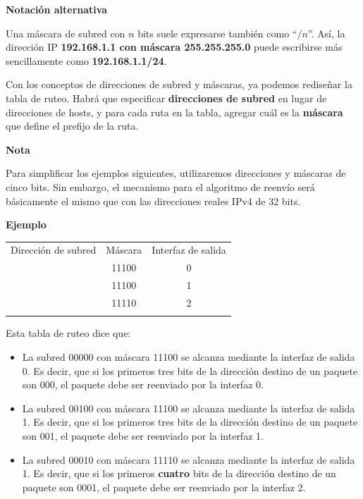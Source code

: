 \documentclass[spanish,A4,]{article}
\begin{document}
\textbf{Notación alternativa}

Una máscara de subred con $n$ bits suele expresarse también como
``$/n$''. Así, la dirección IP \textbf{192.168.1.1 con máscara
255.255.255.0} puede escribirse más sencillamente como
\textbf{192.168.1.1/24}.

Con los conceptos de direcciones de subred y máscaras, ya podemos
rediseñar la tabla de ruteo. Habrá que especificar \textbf{direcciones
de subred} en lugar de direcciones de hosts, y para cada ruta en la
tabla, agregar cuál es la \textbf{máscara} que define el prefijo de la
ruta.

\textbf{Nota}

Para simplificar los ejemplos siguientes, utilizaremos direcciones y
máscaras de cinco bits. Sin embargo, el mecanismo para el algoritmo de
reenvío será básicamente el mismo que con las direcciones reales IPv4 de
32 bits.

\textbf{Ejemplo}

\begin{longtable}[c]{@{}ccc@{}}
\toprule\addlinespace
Dirección de subred & Máscara & Interfaz de salida
\\\addlinespace
\midrule\endhead
00000 & 11100 & 0
\\\addlinespace
00100 & 11100 & 1
\\\addlinespace
00010 & 11110 & 2
\\\addlinespace
\bottomrule
\end{longtable}

Esta tabla de ruteo dice que:

\begin{itemize}
\itemsep1pt\parskip0pt
\item
  La subred 00000 con máscara 11100 se alcanza mediante la interfaz de
  salida 0. Es decir, que si los primeros tres bits de la dirección
  destino de un paquete son 000, el paquete debe ser reenviado por la
  interfaz 0.
\item
  La subred 00100 con máscara 11100 se alcanza mediante la interfaz de
  salida 1. Es decir, que si los primeros tres bits de la dirección
  destino de un paquete son 001, el paquete debe ser reenviado por la
  interfaz 1.
\item
  La subred 00010 con máscara 11110 se alcanza mediante la interfaz de
  salida 1. Es decir, que si los primeros \textbf{cuatro} bits de la
  dirección destino de un paquete son 0001, el paquete debe ser
  reenviado por la interfaz 2.
\end{itemize}
\end{document}
